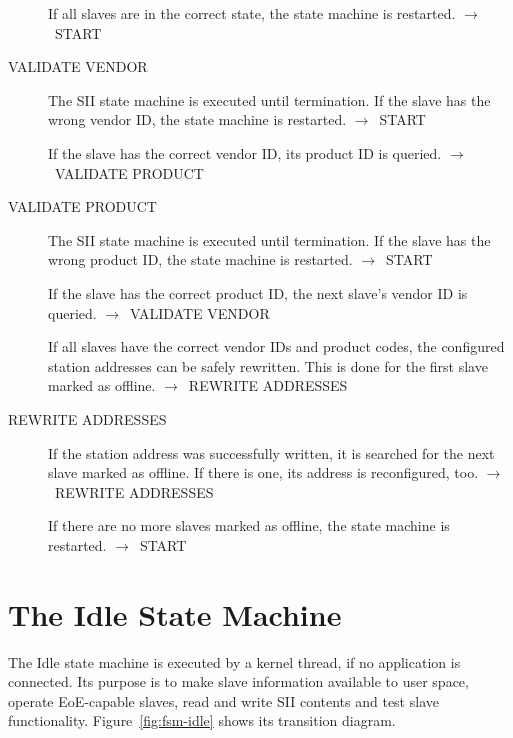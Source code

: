 \documentclass[a4paper,12pt,BCOR6mm,bibtotoc,idxtotoc]{scrbook}
\begin{document}
\begin{description}
  If all slaves are in the correct state, the state machine is
  restarted. $\rightarrow$~START

\item[VALIDATE VENDOR] The SII state machine is executed until
  termination. If the slave has the wrong vendor ID, the state machine
  is restarted. $\rightarrow$~START

  If the slave has the correct vendor ID, its product ID is queried.
  $\rightarrow$~VALIDATE PRODUCT

\item[VALIDATE PRODUCT] The SII state machine is executed until
  termination. If the slave has the wrong product ID, the state
  machine is restarted. $\rightarrow$~START

  If the slave has the correct product ID, the next slave's vendor ID
  is queried. $\rightarrow$~VALIDATE VENDOR

  If all slaves have the correct vendor IDs and product codes, the
  configured station addresses can be safely rewritten. This is done
  for the first slave marked as offline.
  $\rightarrow$~REWRITE ADDRESSES

\item[REWRITE ADDRESSES] If the station address was successfully written, it is
searched for the next slave marked as offline. If there is one, its address is
reconfigured, too.  $\rightarrow$~REWRITE ADDRESSES

  If there are no more slaves marked as offline, the state machine is
  restarted. $\rightarrow$~START
\end{description}


\section{The Idle State Machine}
\label{sec:fsm-idle}

The Idle state machine is executed by a kernel thread, if no application is
connected. Its purpose is to make slave information available to user space,
operate EoE-capable slaves, read and write SII contents and test slave
functionality.  Figure~\ref{fig:fsm-idle} shows its transition diagram.
\end{document}
